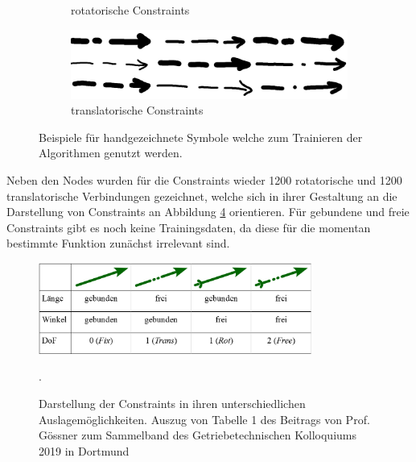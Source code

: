 \begin{figure}
\begin{subfigure}[b]{0.4\textwidth}
      \caption{rotatorische Constraints}
      \label{fig:rs}
    \end{subfigure}
    \begin{subfigure}[b]{0.4\textwidth}
      \includegraphics[width=\textwidth]{images/ts.png}
      \caption{translatorische Constraints}
      \label{fig:ts}
    \end{subfigure}
    \caption{Beispiele für handgezeichnete Symbole welche zum Trainieren der Algorithmen genutzt werden.}
    \label{fig:example_symbols}
\end{figure}

Neben den Nodes wurden für die Constraints wieder 1200 rotatorische und 1200 translatorische Verbindungen gezeichnet, welche sich in ihrer Gestaltung an die Darstellung von Constraints an Abbildung \ref{fig:constraints_gtk} orientieren.
Für gebundene und freie Constraints gibt es noch keine Trainingsdaten, da diese für die momentan bestimmte Funktion zunächst irrelevant sind.

\begin{figure}
  \centering
  \includegraphics[width=0.8\textwidth]{images/gtk2019_tab1.png}
  \caption{Darstellung der Constraints in ihren unterschiedlichen Auslagemöglichkeiten. Auszug von Tabelle 1 des Beitrags von Prof. Gössner zum Sammelband des Getriebetechnischen Kolloquiums 2019 in Dortmund\cite{Goessner2019a}}.
  \label{fig:constraints_gtk}
\end{figure}
